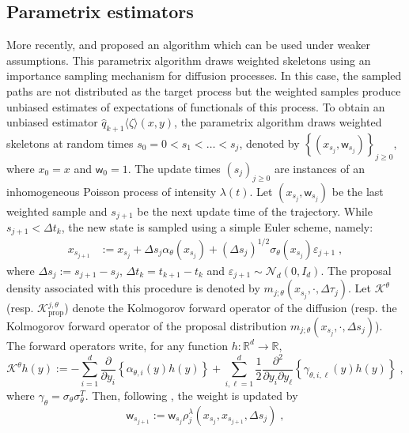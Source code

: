 \documentclass{article}
\newcommand{\parvec}{\theta}
\newcommand{\hdhat}[1]{\widehat{q}_{#1}}
\newcommand{\eqdef}{\ensuremath{:=}}
\newcommand{\eqsp}{\;}
\begin{document}
\subsection{Parametrix estimators}

More recently, \cite{andersson2017unbiased} and \cite{fearnhead2017continuous} proposed an algorithm which can be used under weaker assumptions. 
This parametrix algorithm draws weighted skeletons using an importance sampling mechanism for diffusion processes. 
In this case, the sampled paths are not distributed as the target process but the weighted samples produce unbiased estimates of expectations of functionals of this process. To obtain an unbiased estimator $\hdhat{k+1}\langle \zeta\rangle(x,y)$, the parametrix algorithm draws weighted skeletons at random times $s_0 = 0 < s_1<\dots<s_j $, denoted by $\left\{(x_{s_j},\mathsf{w}_{s_j})\right\}_{j\geqslant 0}$, where $x_0 = x$ and $\mathsf{w}_0=1$. 
The update times $(s_j)_{j\geqslant 0}$ are instances of an inhomogeneous Poisson process of intensity $\lambda(t)$. 
Let $(x_{s_j},\mathsf{w}_{s_j})$ be the last weighted sample and $s_{j+1}$ be the next update time of the trajectory.  While $s_{j+1}<\Delta t_{k}$, the new state is sampled using a simple Euler scheme, namely:
\begin{align*}
x_{s_{j+1}} &\eqdef x_{s_j} + \Delta s_j\alpha_{\parvec}(x_{s_j}) + (\Delta s_j)^{1/2}\sigma_{\parvec}(x_{s_j})\varepsilon_{j+1}\eqsp,
\end{align*}
where $\Delta s_j \eqdef s_{j+1}-s_j$, $\Delta t_{k} = t_{k+1} - t_{k}$ and $\varepsilon_{j+1}\sim\mathcal{N}_d(0,I_d)$. 
The proposal density associated with this procedure is denoted by $m_{j;\parvec}\left(x_{s_j},\cdot,\Delta\tau_j\right)$. 
Let $\mathcal{K}^{\parvec}$ (resp. $\mathcal{K}^{j,\parvec}_{\mathrm{prop}}$) denote the Kolmogorov forward operator of the diffusion  (resp. the Kolmogorov forward operator of the proposal distribution $m_{j;\parvec}\left(x_{s_j},\cdot,\Delta s_j
\right)$). 
The forward operators write, for any function $h:\mathbb{R}^d\rightarrow\mathbb{R}$,
$$
\mathcal{K}^{\theta}h\left(y\right) \eqdef -\sum_{i=1}^d\frac{\partial}{\partial y_i}\left\{\alpha_{\parvec,i}(y)h\left(y\right)\right\} + \sum_{i,\ell=1}^d\frac{1}{2}\frac{\partial^2}{\partial y_i\partial y_\ell}\left\{\gamma_{\parvec,i,\ell}(y)h\left(y\right)\right\}\eqsp,
$$
where $\gamma_\parvec = \sigma_\parvec \sigma_\parvec^T$.
Then, following \cite{fearnhead2017continuous}, the weight is updated by
\[
\mathsf{w}_{s_{j+1}}\eqdef\mathsf{w}_{s_j}\rho^{\lambda}_j\left(x_{s_j},x_{s_{j+1}},\Delta s_j\right)\eqsp,
\]
\end{document}
